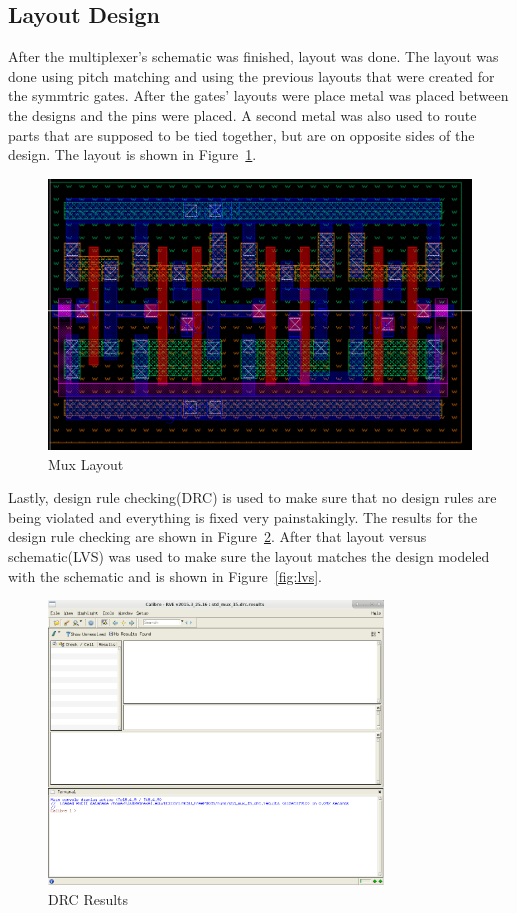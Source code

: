\documentclass[12pt]{article}
\begin{document}
\subsection{Layout Design}
After the multiplexer's schematic was finished, layout was done. The layout was done using
pitch matching and using the previous layouts that were created for the symmtric gates.
After the gates' layouts were place metal was placed between the designs and the pins were
placed. A second metal was also used to route parts that are supposed to be tied together, but are
on opposite sides of the design. The layout is shown in Figure~\ref{fig:layout}.
\begin{figure}[!htb]
  \centering
  \includegraphics[width=5in]{figures/layout.png}
  \caption{Mux Layout}\label{fig:layout}
\end{figure}
Lastly, design rule checking(DRC) is used to make sure that no design rules are being violated and
everything is fixed very painstakingly. The results for the design rule checking are shown in
Figure~\ref{fig:drc}. After that layout versus schematic(LVS) was used to make sure the layout matches
the design modeled with the schematic and is shown in Figure~\ref{fig:lvs}.
\begin{figure}[!htb]
  \centering
  \includegraphics[width=3.5in]{figures/drc.png}
  \caption{DRC Results}\label{fig:drc}
\end{figure}
\end{document}
